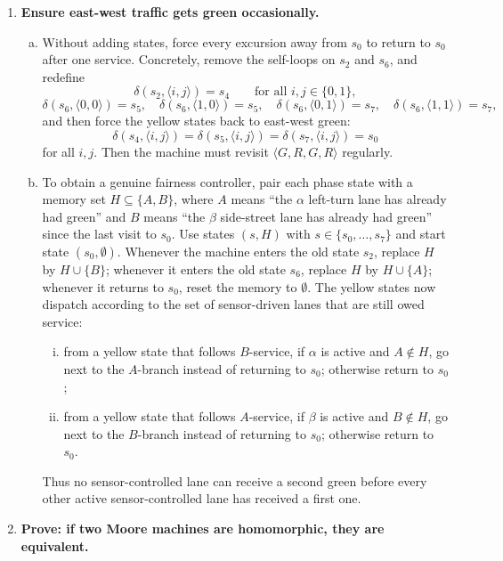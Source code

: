 \begin{enumerate}[{7.}1.]
\item \textbf{Ensure east-west traffic gets green occasionally.}

\begin{enumerate}[(a)]
  \item Without adding states, force every excursion away from $s_0$ to return to
  $s_0$ after one service.  Concretely, remove the self-loops on $s_2$ and $s_6$,
  and redefine
  \[
    \delta(s_2,\langle i,j\rangle)=s_4\qquad\text{for all }i,j\in\{0,1\},
  \]
  \[
    \delta(s_6,\langle 0,0\rangle)=s_5,\quad
    \delta(s_6,\langle 1,0\rangle)=s_5,\quad
    \delta(s_6,\langle 0,1\rangle)=s_7,\quad
    \delta(s_6,\langle 1,1\rangle)=s_7,
  \]
  and then force the yellow states back to east-west green:
  \[
    \delta(s_4,\langle i,j\rangle)=\delta(s_5,\langle i,j\rangle)=
    \delta(s_7,\langle i,j\rangle)=s_0
  \]
  for all $i,j$.  Then the machine must revisit
  $\langle G,R,G,R\rangle$ regularly.

  \item To obtain a genuine fairness controller, pair each phase state with a
  memory set $H\subseteq\{A,B\}$, where $A$ means ``the $\alpha$ left-turn lane
  has already had green'' and $B$ means ``the $\beta$ side-street lane has
  already had green'' since the last visit to $s_0$.  Use states $(s,H)$ with
  $s\in\{s_0,\ldots,s_7\}$ and start state $(s_0,\emptyset)$.  Whenever the
  machine enters the old state $s_2$, replace $H$ by $H\cup\{B\}$; whenever it
  enters the old state $s_6$, replace $H$ by $H\cup\{A\}$; whenever it returns to
  $s_0$, reset the memory to $\emptyset$.  The yellow states now dispatch
  according to the set of sensor-driven lanes that are still owed service:
  \begin{enumerate}[(i)]
    \item from a yellow state that follows $B$-service, if $\alpha$ is active and
    $A\notin H$, go next to the $A$-branch instead of returning to $s_0$;
    otherwise return to $s_0$;
    \item from a yellow state that follows $A$-service, if $\beta$ is active and
    $B\notin H$, go next to the $B$-branch instead of returning to $s_0$;
    otherwise return to $s_0$.
  \end{enumerate}
  Thus no sensor-controlled lane can receive a second green before every other
  active sensor-controlled lane has received a first one.
\end{enumerate}

\item \textbf{Prove: if two Moore machines are homomorphic, they are equivalent.}


\end{enumerate}
